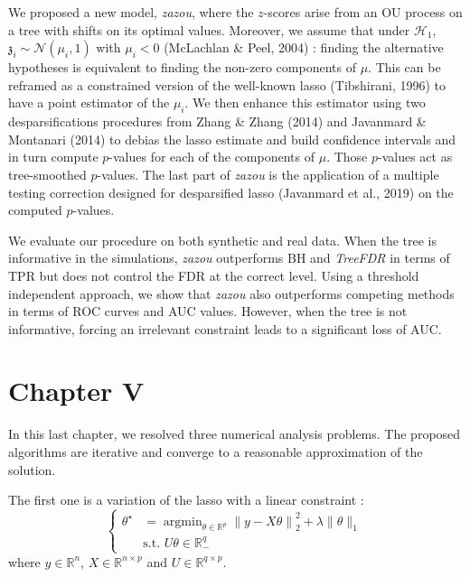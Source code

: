 \documentclass[12pt,a4paper]{reedthesis}
\newcommand \RR {\mathbb{R}}
\newcommand \normal [2] {\mathcal{N}\left({#1},{#2}\right)}
\newcommand \zs {\mathfrak{z}}
\newcommand \param {\theta}
\DeclareMathOperator*{\argmin}{argmin}
\theoremstyle{definition}
\theoremstyle{definition}
\theoremstyle{definition}
\theoremstyle{remark}
\begin{document}
We proposed a new model, \emph{zazou}, where the \(z\)-scores arise from an OU process on a tree with shifts on its optimal values. Moreover, we assume that under \(\mathcal{H}_1\), \(\zs_i \sim \normal{\mu_i}{1}\) with \(\mu_i < 0\) (McLachlan \& Peel, 2004) : finding the alternative hypotheses is equivalent to finding the non-zero components of \(\mu\). This can be reframed as a constrained version of the well-known lasso (Tibshirani, 1996) to have a point estimator of the \(\mu_i\). We then enhance this estimator using two desparsifications procedures from Zhang \& Zhang (2014) and Javanmard \& Montanari (2014) to debias the lasso estimate and build confidence intervals and in turn compute \(p\)-values for each of the components of \(\mu\). Those \(p\)-values act as tree-smoothed \(p\)-values. The last part of \emph{zazou} is the application of a multiple testing correction designed for desparsified lasso (Javanmard et al., 2019) on the computed \(p\)-values.

We evaluate our procedure on both synthetic and real data. When the tree is informative in the simulations, \emph{zazou} outperforms BH and \emph{TreeFDR} in terms of TPR but does not control the FDR at the correct level. Using a threshold independent approach, we show that \emph{zazou} also outperforms competing methods in terms of ROC curves and AUC values. However, when the tree is not informative, forcing an irrelevant constraint leads to a significant loss of AUC.

\hypertarget{chapter-v}{%
\section*{Chapter V}\label{chapter-v}}

In this last chapter, we resolved three numerical analysis problems. The proposed algorithms are iterative and converge to a reasonable approximation of the solution.

The first one is a variation of the lasso with a linear constraint :
\begin{equation*}
\left\{
  \begin{aligned}
  \param^\star & = \argmin_{\param \in \RR^p} \left\|y - X\param\right\|_2^2 + \lambda \|\param\|_1 \\
        & \text{s.t. } U\param \in \RR^q_{-}
  \end{aligned}
\right.
\end{equation*}
where \(y \in \RR^n\), \(X \in \RR^{n\times p}\) and \(U \in \RR^{q \times p}\).
\end{document}
